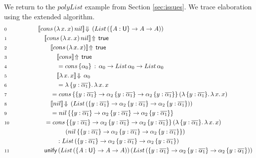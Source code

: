 \documentclass[acmsmall,review,anonymous,prologue,dvipsnames]{acmart}\settopmatter{printfolios=true,printccs=false,printacmref=false}
\renewcommand{\U}{\mathsf{U}}
\newcommand{\unify}{\mathsf{unify}}
\newcommand{\echeckt}[2]{\llbracket#1\rrbracket\!\Downarrow\,#2}
\newcommand{\einfert}[2]{\llbracket#1\rrbracket\!\Uparrow\,#2}
\newcommand{\true}{\mathsf{true}}
\newcommand{\ol}[1]{\overline{#1}}
\theoremstyle{remark}
\begin{document}
\begin{example}
We return to the $polyList$ example from Section \ref{sec:issues}. We trace
elaboration using the extended algorithm.
\begin{alignat*}{3}
  & \scriptstyle{0 }\qquad\qquad && \echeckt{cons\,(\lambda\,x.\,x)\,nil}{(List\,(\{A : \U\}\to A \to A))}
      \hspace{14em}\\
  & \scriptstyle{1 }  && \quad \einfert{cons\,(\lambda\,x.\,x)\,nil}{\true} \\
  & \scriptstyle{2 }  && \qquad \einfert{cons\,(\lambda\,x.\,x)}{\true}\\
  & \scriptstyle{3 }  && \qquad\quad \einfert{cons}{\true}\\
  & \scriptstyle{4 }  && \qquad\quad = cons\,\{\alpha_0\}\,:\,\alpha_0 \to List\,\alpha_0 \to List\,\alpha_0\\
  & \scriptstyle{5 }  && \qquad\quad \echeckt{\lambda\,x.\,x}{\alpha_0}\\
  & \scriptstyle{6 }  && \qquad\quad = \lambda\,\{y : \ol{\alpha_1}\}.\,\lambda\,x.\,x\\
  & \scriptstyle{7 }  && \qquad = cons\,
                       \{\{y : \ol{\alpha_1}\} \to \alpha_2\,\{y : \ol{\alpha_1}\}\to \alpha_2\,\{y : \ol{\alpha_1}\}\}\,
                       (\lambda\,\{y : \ol{\alpha_1}\}.\,\lambda\,x.\,x)\\
  & \scriptstyle{8 }  && \qquad \echeckt{nil}{(List\,(\{y : \ol{\alpha_1}\} \to \alpha_2\,\{y : \ol{\alpha_1}\}\to \alpha_2\,\{y : \ol{\alpha_1}\}))}\\
  & \scriptstyle{9 }  && \qquad = nil\,\{\{y : \ol{\alpha_1}\} \to \alpha_2\,\{y : \ol{\alpha_1}\}\to \alpha_2\,\{y : \ol{\alpha_1}\}\}\\
                       & \scriptstyle{10} && \quad = cons\,\{\{y : \ol{\alpha_1}\} \to \alpha_2\,\{y : \ol{\alpha_1}\}\to \alpha_2\,\{y : \ol{\alpha_1}\}\}\,(\lambda\,\{y : \ol{\alpha_1}\}.\,\lambda\,x.\,x)\,\\
                       & && \hspace{4.4em} (nil\,\{\{y : \ol{\alpha_1}\} \to \alpha_2\,\{y : \ol{\alpha_1}\}\to \alpha_2\,\{y : \ol{\alpha_1}\}\})\\
  & && \hspace{3em} : List\,(\{y : \ol{\alpha_1}\} \to \alpha_2\,\{y : \ol{\alpha_1}\}\to \alpha_2\,\{y : \ol{\alpha_1}\})\\
  & \scriptstyle{11} && \quad \unify\,(List\,(\{A : \U\}\to A \to A))\,(List\,(\{y : \ol{\alpha_1}\} \to \alpha_2\,\{y : \ol{\alpha_1}\}\to \alpha_2\,\{y : \ol{\alpha_1}\}))\\

\end{alignat*}
\end{example}
\end{document}
